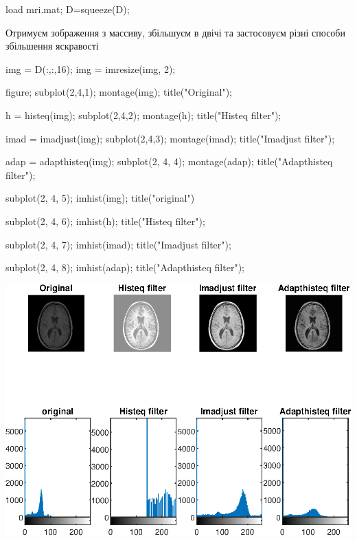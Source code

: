 \documentclass[12pt]{article}
\begin{document}
\begin{matlabcode}
load mri.mat;
D=squeeze(D);
\end{matlabcode}


\begin{par}
\begin{flushleft}
Отримуєм зображення з массиву, збільшуєм в двічі
та застосовуєм різні способи збільшення  яскравості
\end{flushleft}
\end{par}

\begin{matlabcode}
img = D(:,:,16);
img = imresize(img, 2);

figure;
subplot(2,4,1);
montage(img);
title("Original");

h = histeq(img);
subplot(2,4,2);
montage(h);
title("Histeq filter");

imad = imadjust(img);
subplot(2,4,3);
montage(imad);
title("Imadjust filter");

adap = adapthisteq(img);
subplot(2, 4, 4);
montage(adap);
title("Adapthisteq filter");

subplot(2, 4, 5);
imhist(img);
title("original")

subplot(2, 4, 6);
imhist(h);
title("Histeq filter");

subplot(2, 4, 7);
imhist(imad);
title("Imadjust filter");


subplot(2, 4, 8);
imhist(adap);
title("Adapthisteq filter");
\end{matlabcode}
\begin{center}
\includegraphics[width=\maxwidth{56.196688409433015em}]{figure_0}
\end{center}
\end{document}
